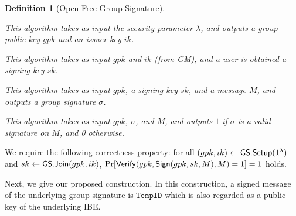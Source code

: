 \documentclass[preprint]{sig-alternate}
\newtheorem{definition}{Definition}[section]
\begin{document}
\begin{definition}[Open-Free Group Signature]~
\begin{description}
\setlength{\itemsep}{0em}\setlength{\parsep}{0em}
\item[{\sf GS.Setup}:] This algorithm takes as input the security parameter $\lambda$, 
and outputs a group public key $gpk$ and an issuer key $ik$. 
\item[{\sf GS.Join}:] This algorithm takes as input $gpk$ and $ik$ (from GM), and a user is obtained a signing key $sk$. 

\item[{\sf Sign}:] This algorithm takes as input $gpk$, a signing key $sk$, and a message $M$, and outputs a group signature $\sigma$. 
\item[{\sf Verify}:] This algorithm takes as input $gpk$, $\sigma$, and $M$, and outputs $1$ if $\sigma$ is a valid signature on $M$, and 0 otherwise. 
\end{description}

\end{definition}

\noindent 
We require the following correctness property: for all $(gpk,ik)\allowbreak \leftarrow {\sf GS.Setup}(1^\lambda)$ and $sk\leftarrow {\sf GS.Join}(gpk,ik)$, $\Pr[{\sf Verify}(gpk,\allowbreak {\sf Sign}(gpk,\allowbreak sk,M),M)=1]=1$ holds. 

Next, we give our proposed construction. In this construction, a signed message of the underlying group signature is $\mathtt{TempID}$ which is also regarded as a public key of the underlying IBE. 
\end{document}
